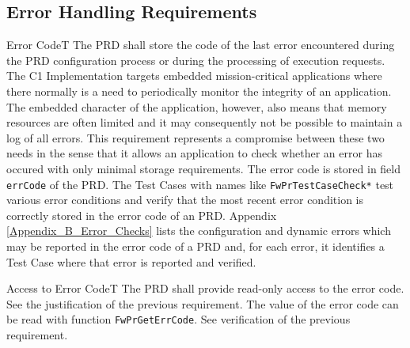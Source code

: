 \documentclass[requirements]{../fwprofile}
\begin{document}
\subsection{Error Handling Requirements}\label{req:errorCodePR}

\begin{fw_req}{Error Code}{T}
{The PRD shall store the code of the last error encountered during the PRD 
configuration process or during the processing of execution requests.}
{The C1 Implementation targets embedded mission-critical applications 
where there normally is a need to periodically monitor the integrity of an application. 
The embedded character of the application, however, also means that memory resources are often 
limited and it may consequently not be possible to maintain a log of all errors. 
This requirement represents a compromise between these two needs in the sense that it allows an 
application to check whether an error has occured with only minimal storage requirements.}
{The error code is stored in field \texttt{errCode} of the PRD.} 
{The Test Cases with names like \texttt{FwPrTestCaseCheck*} test various 
error conditions and verify that the most recent error condition is correctly stored in the error 
code of an PRD. 
Appendix \ref{Appendix_B_Error_Checks} lists the configuration and dynamic errors which may be 
reported in the error code of a PRD and, for each error, it identifies a Test Case where that 
error is reported and verified.}
\end{fw_req}


\begin{fw_req}{Access to Error Code}{T}
{The PRD shall provide read-only access to the error code.}
{See the justification of the previous requirement.}
{The value of the error code can be read with function 
\texttt{FwPrGetErrCode}.} 
{See verification of the previous requirement.}
\end{fw_req}
\end{document}
